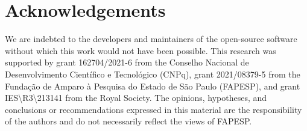 \section{Acknowledgements}

We are indebted to the developers and maintainers of the open-source software without which this work would not have been possible.
This research was supported by
grant 162704/2021-6 from the Conselho Nacional de Desenvolvimento Científico e Tecnológico (CNPq),
grant 2021/08379-5 from the Fundação de Amparo à Pesquisa do Estado de São Paulo (FAPESP),
and grant IES\textbackslash{}R3\textbackslash{}213141 from the Royal Society.
The opinions, hypotheses, and conclusions or recommendations expressed in this material are the responsibility of the authors and do not necessarily reflect the views of FAPESP.
